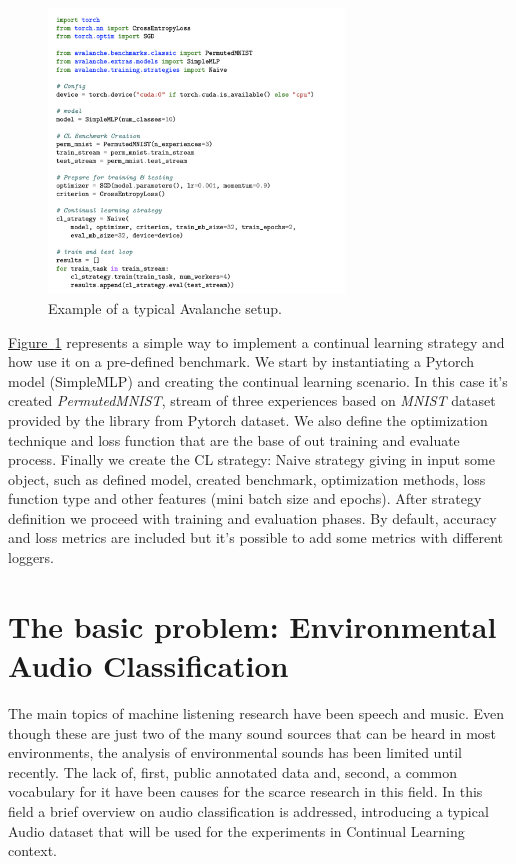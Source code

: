 \documentclass[english, LaM, oneside]{sapthesis}%
\begin{document}
\begin{figure}[h]
            \centering
            \includegraphics[width=0.70\textwidth]{example_avalanche.png}
            \caption{Example of a typical Avalanche setup.}
            \label{fig:avalanche_setup}
\end{figure}
\hyperref[fig:avalanche_setup]{Figure~\ref*{fig:avalanche_setup}} represents a simple way to implement a continual learning strategy and how use it on a pre-defined benchmark. We start by instantiating a Pytorch model (SimpleMLP) and creating  the continual learning scenario. In this case it's created \textit{PermutedMNIST}, stream of three experiences based on \textit{MNIST} dataset provided by the library from Pytorch dataset. We also define the optimization technique and loss function that are the base of out training and evaluate process. Finally we create the CL strategy: Naive strategy giving in input some object, such as defined model, created benchmark, optimization methods, loss function type and other features (mini batch size and epochs). After strategy definition we proceed with training and evaluation phases. By default, accuracy and loss metrics are included but it's possible to add some metrics with different loggers. 

\chapter{The basic problem: Environmental Audio Classification}
\label{audio}
The main topics of machine listening research have been speech and music. Even though these are just two of the many sound sources that can be heard in most environments, the analysis of environmental sounds has been limited until recently. The lack of, first, public annotated data and, second, a common vocabulary for it have been causes for the scarce research in this field.
In this field a brief overview on audio classification is addressed, introducing a typical Audio dataset that will be used for the experiments in Continual Learning context. 
\end{document}
